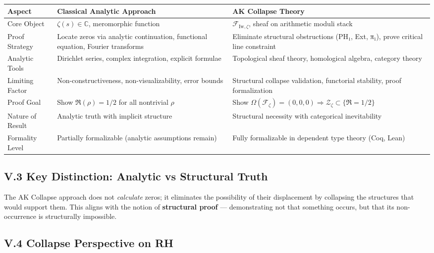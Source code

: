 \documentclass[11pt]{article}
\begin{document}
\begin{center}
\renewcommand{\arraystretch}{1.3}
\begin{tabular}{|p{4.2cm}|p{5.8cm}|p{5.8cm}|}
\hline
\textbf{Aspect} & \textbf{Classical Analytic Approach} & \textbf{AK Collapse Theory} \\
\hline
Core Object & \( \zeta(s) \in \mathbb{C} \), meromorphic function & \( \mathcal{F}_{\mathrm{Iw},\zeta} \), sheaf on arithmetic moduli stack \\
\hline
Proof Strategy & Locate zeros via analytic continuation, functional equation, Fourier transforms & Eliminate structural obstructions (PH₁, Ext, π₁), prove critical line constraint \\
\hline
Analytic Tools & Dirichlet series, complex integration, explicit formulae & Topological sheaf theory, homological algebra, category theory \\
\hline
Limiting Factor & Non-constructiveness, non-visualizability, error bounds & Structural collapse validation, functorial stability, proof formalization \\
\hline
Proof Goal & Show \( \Re(\rho) = 1/2 \) for all nontrivial \( \rho \) & Show \( \Omega(\mathcal{F}_{\zeta}) = (0,0,0) \Rightarrow \mathcal{Z}_\zeta \subset \{ \Re = 1/2 \} \) \\
\hline
Nature of Result & Analytic truth with implicit structure & Structural necessity with categorical inevitability \\
\hline
Formality Level & Partially formalizable (analytic assumptions remain) & Fully formalizable in dependent type theory (Coq, Lean) \\
\hline
\end{tabular}
\end{center}

\subsection*{V.3 Key Distinction: Analytic vs Structural Truth}

The AK Collapse approach does not \emph{calculate} zeros; it eliminates the possibility of their displacement by collapsing the structures that would support them. This aligns with the notion of \textbf{structural proof} — demonstrating not that something occurs, but that its non-occurrence is structurally impossible.

\subsection*{V.4 Collapse Perspective on RH}
\end{document}
